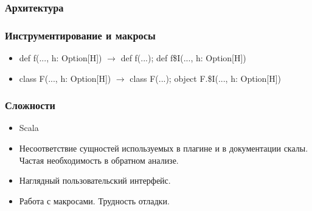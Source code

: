 \documentclass{beamer}
\begin{document}
\begin{frame}
\frametitle{Архитектура}
\begin{center}
\end{center}
\end{frame}




\begin{frame}
\frametitle{Инструментирование и макросы}
\begin{itemize}
  \item def f(..., h: Option[H]) $\to$ def f(...); def f\$I(..., h: Option[H])
  \item class F(..., h: Option[H]) $\to$ class F(...); object F.\$I(..., h: Option[H])
\end{itemize}
\realExample
\end{frame}


\begin{frame}
\frametitle{Сложности}
\begin{itemize}
  \item Scala
  \item Несоответствие сущностей используемых в плагине и в документации скалы.
  Частая необходимость в обратном анализе.
  \item Наглядный пользовательский интерфейс.
  \item Работа с макросами. Трудность отладки. %
\end{itemize}
\end{frame}
\end{document}
